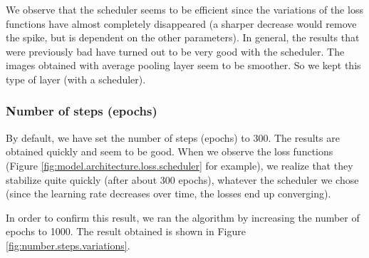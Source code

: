 \documentclass[twocolumn,superscriptaddress,aps,floatfix,nofootinbib]{revtex4-1}
\begin{document}
    We observe that the scheduler seems to be efficient since the variations of the loss functions have almost completely disappeared (a sharper decrease would remove the spike, but is dependent on the other parameters). In general, the results that were previously bad have turned out to be very good with the scheduler. The images obtained with average pooling layer seem to be smoother. So we kept this type of layer (with a scheduler).
    
    \subsubsection{Number of steps (epochs)}
    
    By default, we have set the number of steps (epochs) to 300. The results are obtained quickly and seem to be good. When we observe the loss functions (Figure \ref{fig:model.architecture.loss.scheduler} for example), we realize that they stabilize quite quickly (after about 300 epochs), whatever the scheduler we chose (since the learning rate decreases over time, the losses end up converging).
    
    In order to confirm this result, we ran the algorithm by increasing the number of epochs to 1000. The result obtained is shown in Figure \ref{fig:number.steps.variations}.
    
\end{document}
